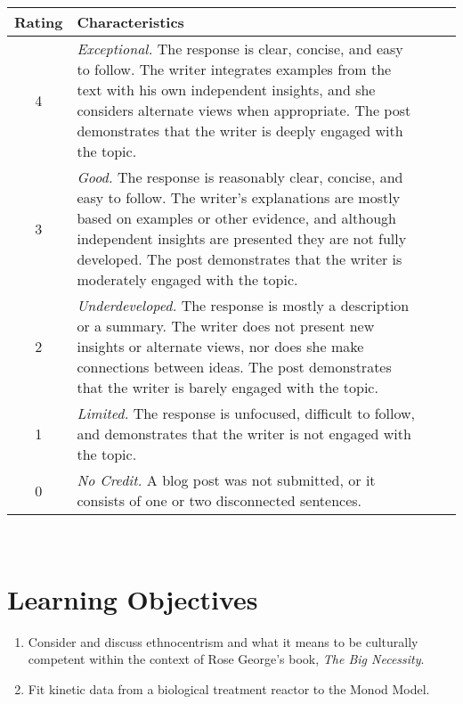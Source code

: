 \documentclass[12pt,letterpaper]{article}
\begin{document}
\begin{minipage}{\linewidth}
\centering

\begin{tabular}{|c|p{14cm}|l|c|}\toprule[1.25pt]
\bf Rating	& \bf Characteristics\\\midrule
4	& \emph{Exceptional.} The response is clear, concise, and easy to follow. The writer integrates examples from the text with his own independent insights, and she considers alternate views when appropriate. The post demonstrates that the writer is deeply engaged with the topic.\\ \hline

3	& \emph{Good.} The response is reasonably clear, concise, and easy to follow. The writer's explanations are mostly based on examples or other evidence, and although independent insights are presented they are not fully developed. The post demonstrates that the writer is moderately engaged with the topic.\\ \hline

2	& \emph{Underdeveloped.} The response is mostly a description or a summary. The writer does not present new insights or alternate views, nor does she make connections between ideas. The post demonstrates that the writer is barely engaged with the topic.\\ \hline

1	& \emph{Limited.} The response is unfocused, difficult to follow, and demonstrates that the writer is not engaged with the topic.\\ \hline

0	& \emph{No Credit.} A blog post was not submitted, or it consists of one or two disconnected sentences.\\ \hline

\bottomrule[1.25pt]

\end {tabular}\par
\end{minipage}\\


\section *{Learning Objectives}
\begin{enumerate}
\item Consider and discuss ethnocentrism and what it means to be culturally competent within the context of Rose George's book, \emph{The Big Necessity}.
\item Fit kinetic data from a biological treatment reactor to the Monod Model.
\end{enumerate}
 
\end{document}
